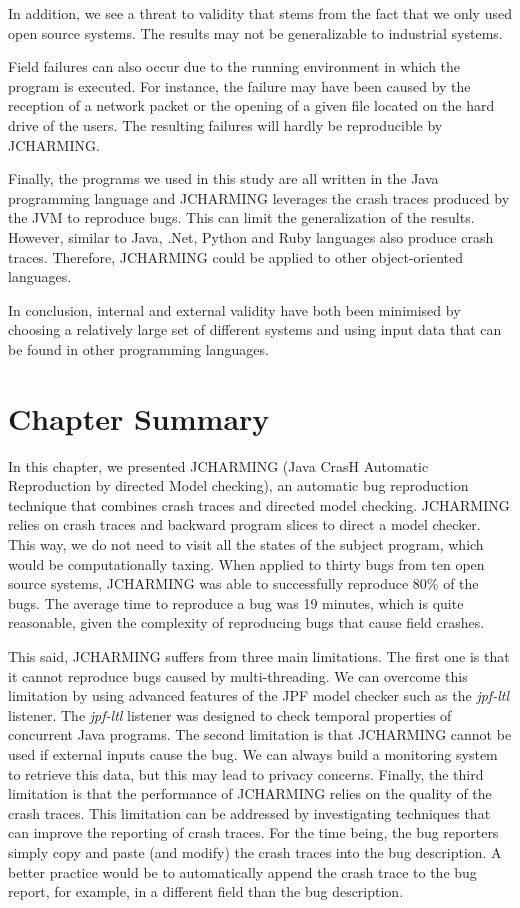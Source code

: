 \documentclass[12pt]{report}
\begin{document}
In addition, we see a threat to validity that stems from the fact that
we only used open source systems. The results may not be generalizable
to industrial systems.

Field failures can also occur due to the running environment in which
the program is executed. For instance, the failure may have been caused
by the reception of a network packet or the opening of a given file
located on the hard drive of the users. The resulting failures will
hardly be reproducible by JCHARMING.

Finally, the programs we used in this study are all written in the Java
programming language and JCHARMING leverages the crash traces produced
by the JVM to reproduce bugs. This can limit the generalization of the
results. However, similar to Java, .Net, Python and Ruby languages also
produce crash traces. Therefore, JCHARMING could be applied to other
object-oriented languages.

In conclusion, internal and external validity have both been minimised
by choosing a relatively large set of different systems and using input
data that can be found in other programming languages.

\section{\texorpdfstring{Chapter
Summary\label{sec:conclusion}}{Chapter Summary}}\label{chapter-summary-4}

In this chapter, we presented JCHARMING (Java CrasH Automatic
Reproduction by directed Model checking), an automatic bug reproduction
technique that combines crash traces and directed model checking.
JCHARMING relies on crash traces and backward program slices to direct a
model checker. This way, we do not need to visit all the states of the
subject program, which would be computationally taxing. When applied to
thirty bugs from ten open source systems, JCHARMING was able to
successfully reproduce 80\% of the bugs. The average time to reproduce a
bug was 19 minutes, which is quite reasonable, given the complexity of
reproducing bugs that cause field crashes.

This said, JCHARMING suffers from three main limitations. The first one
is that it cannot reproduce bugs caused by multi-threading. We can
overcome this limitation by using advanced features of the JPF model
checker such as the \emph{jpf-ltl} listener. The \emph{jpf-ltl} listener
was designed to check temporal properties of concurrent Java programs.
The second limitation is that JCHARMING cannot be used if external
inputs cause the bug. We can always build a monitoring system to
retrieve this data, but this may lead to privacy concerns. Finally, the
third limitation is that the performance of JCHARMING relies on the
quality of the crash traces. This limitation can be addressed by
investigating techniques that can improve the reporting of crash traces.
For the time being, the bug reporters simply copy and paste (and modify)
the crash traces into the bug description. A better practice would be to
automatically append the crash trace to the bug report, for example, in
a different field than the bug description.
\end{document}
